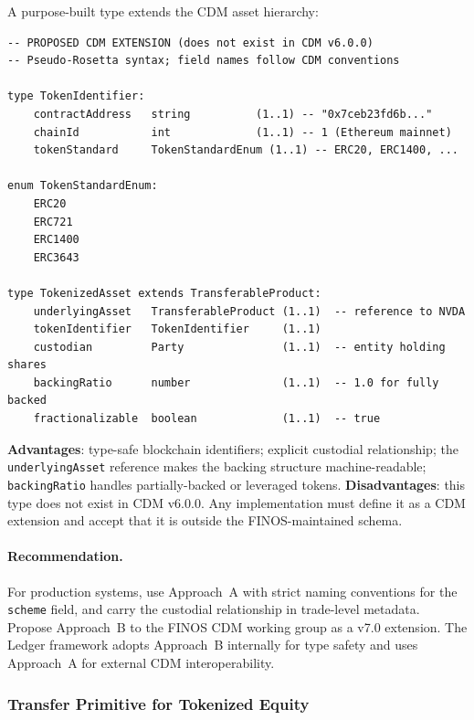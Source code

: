 \documentclass[11pt,a4paper]{article}
\begin{document}
A purpose-built type extends the CDM asset hierarchy:

\begin{lstlisting}
-- PROPOSED CDM EXTENSION (does not exist in CDM v6.0.0)
-- Pseudo-Rosetta syntax; field names follow CDM conventions

type TokenIdentifier:
    contractAddress   string          (1..1) -- "0x7ceb23fd6b..."
    chainId           int             (1..1) -- 1 (Ethereum mainnet)
    tokenStandard     TokenStandardEnum (1..1) -- ERC20, ERC1400, ...

enum TokenStandardEnum:
    ERC20
    ERC721
    ERC1400
    ERC3643

type TokenizedAsset extends TransferableProduct:
    underlyingAsset   TransferableProduct (1..1)  -- reference to NVDA
    tokenIdentifier   TokenIdentifier     (1..1)
    custodian         Party               (1..1)  -- entity holding shares
    backingRatio      number              (1..1)  -- 1.0 for fully backed
    fractionalizable  boolean             (1..1)  -- true
\end{lstlisting}

\noindent\textbf{Advantages}: type-safe blockchain identifiers; explicit custodial relationship; the \texttt{underlyingAsset} reference makes the backing structure machine-readable; \texttt{backingRatio} handles partially-backed or leveraged tokens. \textbf{Disadvantages}: this type does not exist in CDM v6.0.0. Any implementation must define it as a CDM extension and accept that it is outside the FINOS-maintained schema.

\paragraph{Recommendation.} For production systems, use Approach~A with strict naming conventions for the \texttt{scheme} field, and carry the custodial relationship in trade-level metadata. Propose Approach~B to the FINOS CDM working group as a v7.0 extension. The Ledger framework adopts Approach~B internally for type safety and uses Approach~A for external CDM interoperability.

\subsubsection{Transfer Primitive for Tokenized Equity}
\label{sec:cdm-tokenized-transfer}
\end{document}
